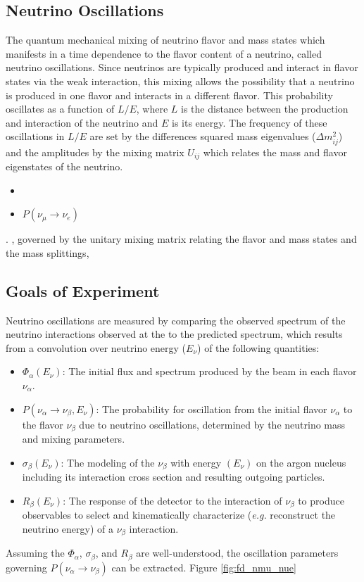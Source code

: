 \subsection{Neutrino Oscillations}
\label{intro:science:nuosc}
The quantum mechanical mixing of neutrino flavor and mass states which manifests in a time dependence to the flavor content of a neutrino, called neutrino oscillations. Since neutrinos are typically produced and interact in flavor states via the weak interaction, this mixing allows the possibility that a neutrino is produced in one flavor and interacts in a different flavor. This probability oscillates as a function of $L/E$, where $L$ is the distance between the production and interaction of the neutrino and $E$ is its energy. The frequency of these oscillations in $L/E$ are set by the differences squared mass eigenvalues ($\Delta m_{ij}^2$) and the amplitudes by the mixing matrix $U_{ij}$ which relates the mass and flavor eigenstates of the neutrino.
\begin{itemize}
    \item 
\item $P(\nu_\mu\to\nu_e)$
\end{itemize}
.  ,  governed by the unitary mixing matrix relating the flavor and mass states and the mass splittings, 


\subsection{Goals of Experiment}
\label{intro:science:goals}
Neutrino oscillations are measured by comparing the observed spectrum of the neutrino interactions observed at the  to the predicted spectrum, which results from a convolution over neutrino energy ($E_\nu$) of the following quantities:
\begin{itemize}
    \item $\Phi_\alpha(E_\nu)$: The initial flux and spectrum produced by the  beam in each flavor $\nu_\alpha$.
    \item $P(\nu_\alpha\to\nu_\beta,E_\nu)$: The probability for oscillation from the initial flavor $\nu_\alpha$ to the flavor $\nu_\beta$ due to neutrino oscillations, determined by the neutrino mass and mixing parameters.
    \item $\sigma_\beta(E_\nu)$: The modeling of the $\nu_\beta$ with energy $(E_\nu)$ on the argon nucleus including its interaction cross section and resulting outgoing particles.
    \item $R_\beta(E_\nu)$:  The response of the detector to the interaction of $\nu_\beta$ to produce observables to select and kinematically characterize ({\em e.g.} reconstruct the neutrino energy) of a $\nu_\beta$ interaction. 
\end{itemize}
Assuming the $\Phi_\alpha$, $\sigma_\beta$, and $R_\beta$ are well-understood, the oscillation parameters governing $P(\nu_\alpha\to\nu_\beta)$ can be extracted. Figure \ref{fig:fd_nmu_nue}

